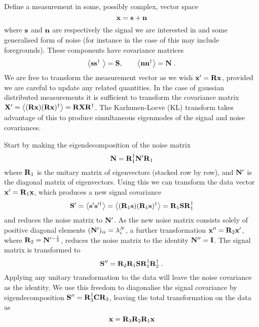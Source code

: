 \documentclass{revtex4}
\begin{document}
Define a measurement in some, possibly complex, vector space
\begin{equation}
\mathbf{x} = \mathbf{s} + \mathbf{n}
\end{equation}
where $\mathbf{s}$ and $\mathbf{n}$ are respectively the signal we are interested in and some
generalised form of noise (for instance in the case of \tcm this may include
foregrounds). These components have covariance matrices
\begin{equation}
\left\langle \mathbf{s} \mathbf{s}^{\dagger}\ \right\rangle = \mathbf{S}, \qquad \left\langle \mathbf{n} \mathbf{n}^{\dagger} \right\rangle = \mathbf{N} \; .
\end{equation}
We are free to transform the measurement vector as we wish $\mathbf{x}' = \mathbf{R}\mathbf{x}$,
provided we are careful to update any related quantities. In the case of
gaussian distributed measurements it is sufficient to transform the covariance
matrix $\mathbf{X}' = \left\langle (\mathbf{R} \mathbf{x}) (\mathbf{R} \mathbf{x})^{\dagger} \right\rangle = \mathbf{R}
\mathbf{X}\mathbf{R}^{\dagger}$. The Karhunen-Loeve (KL) transform takes advantage of this to
produce simultaneous eigenmodes of the signal and noise covariances.

Start by making the eigendecomposition of the noise matrix
\begin{equation}
\mathbf{N} = \mathbf{R}_1^{\dagger} \mathbf{N}' \mathbf{R}_1
\end{equation}
where $\mathbf{R}_1$ is the unitary matrix of eigenvectors (stacked row by row), and
$\mathbf{N}'$ is the diagonal matrix of eigenvectors. Using this we can transform the
data vector $\mathbf{x}' = \mathbf{R}_1 \mathbf{x}$, which produces a new signal covariance
\begin{equation}
\mathbf{S}' = \left\langle \mathbf{s}' \mathbf{s}'^{\dagger} \right\rangle = \left\langle (\mathbf{R}_1 \mathbf{s})  (\mathbf{R}_1 \mathbf{s})^{\dagger}
\right\rangle = \mathbf{R}_1 \mathbf{S} \mathbf{R}_1^{\dagger}
\end{equation}
and reduces the noise matrix to $\mathbf{N}'$. As the new noise matrix consists solely
of positive diagonal elements $(\mathbf{N}')_{ii} = \lambda^N_i$, a further
transformation $\mathbf{x}'' = \mathbf{R}_2 \mathbf{x}'$, where $\mathbf{R}_2 = \mathbf{N}'^{-\frac{1}{2}}$,
reduces the noise matrix to the identity $\mathbf{N}'' = \mathbf{I}$. The signal matrix is
transformed to
\begin{equation}
\mathbf{S}'' = \mathbf{R}_2 \mathbf{R}_1 \mathbf{S} \mathbf{R}_1^{\dagger} \mathbf{R}_2^{\dagger} \; .
\end{equation}
Applying any unitary transformation to the data will leave the noise covariance
as the identity. We use this freedom to diagonalise the signal covariance by
eigendecomposition $\mathbf{S}'' = \mathbf{R}_3^{\dagger} \mathbf{C} \mathbf{R}_3$, leaving the total
transformation on the data as
\begin{equation}
\mathbf{x} = \mathbf{R}_3 \mathbf{R}_2 \mathbf{R}_1 \mathbf{x}
\end{equation}
\end{document}
